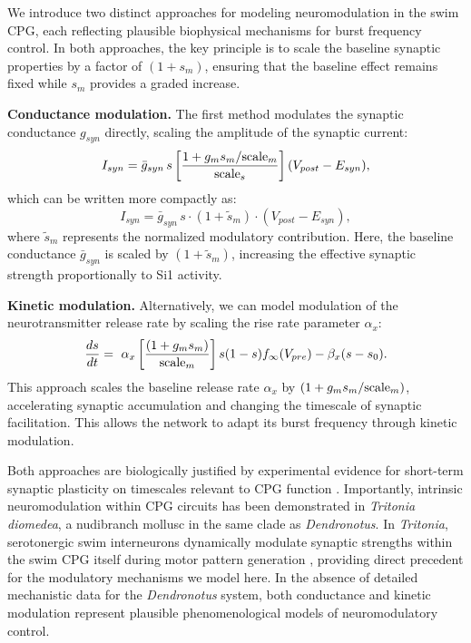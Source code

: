 \documentclass[nofootinbib,aip,amsmath,amssymb,preprint,twocolumn,floatfix,10pt]{revtex4-2}
\begin{document}
We introduce two distinct approaches for modeling neuromodulation in the swim CPG, each reflecting plausible biophysical mechanisms for burst frequency control. In both approaches, the key principle is to scale the baseline synaptic properties by a factor of $(1 + s_m)$, ensuring that the baseline effect remains fixed while $s_m$ provides a graded increase.

\textbf{Conductance modulation.} The first method modulates the synaptic conductance $g_{syn}$ directly, scaling the amplitude of the synaptic current:
\begin{equation}
I_{syn} = {\bar g}_{syn}\,s \left [ \frac{ 1+g_m s_m/{\rm scale}_m}{{\rm scale}_s} \right ] (V_{post}-E_{syn}),
\end{equation}
which can be written more compactly as:
\begin{equation}
I_{syn} = {\bar g}_{syn}\,s \cdot \left (1+{\tilde s_m} \right ) \cdot  (V_{post}-E_{syn}),
\end{equation}
where $\tilde s_m$ represents the normalized modulatory contribution. Here, the baseline conductance ${\bar g}_{syn}$ is scaled by $(1+{\tilde s_m})$, increasing the effective synaptic strength proportionally to Si1 activity.

\textbf{Kinetic modulation.} Alternatively, we can model modulation of the neurotransmitter release rate by scaling the rise rate parameter $\alpha_x$:
\begin{equation}
\frac{ds}{dt} = \ \alpha_x \left [ \frac{(1 + g_m s_m)}{{\rm scale}_m} \right ]  s (1 - s) f_{\infty}(V_{pre}) - \beta_x (s - s_0).
\end{equation}
This approach scales the baseline release rate $\alpha_x$ by $(1 + g_m s_m/{\rm scale}_m)$, accelerating synaptic accumulation and changing the timescale of synaptic facilitation. This allows the network to adapt its burst frequency through kinetic modulation.

Both approaches are biologically justified by experimental evidence for short-term synaptic plasticity on timescales relevant to CPG function \cite{zucker2002short, jackman2017mechanisms}. Importantly, intrinsic neuromodulation within CPG circuits has been demonstrated in \textit{Tritonia diomedea}, a nudibranch mollusc in the same clade as \textit{Dendronotus}. In \textit{Tritonia}, serotonergic swim interneurons dynamically modulate synaptic strengths within the swim CPG itself during motor pattern generation \cite{katz1994dynamic, sakurai2003spike}, providing direct precedent for the modulatory mechanisms we model here. In the absence of detailed mechanistic data for the \textit{Dendronotus} system, both conductance and kinetic modulation represent plausible phenomenological models of neuromodulatory control. 
\end{document}
